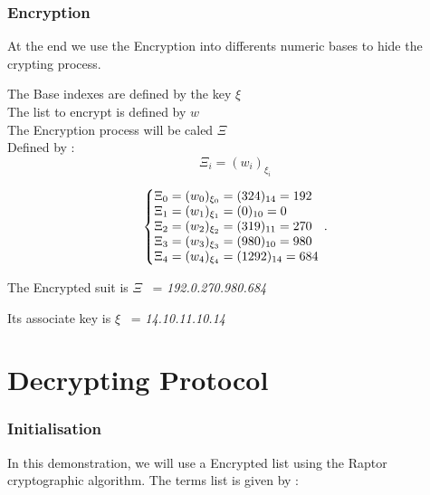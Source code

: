 \documentclass{article}
\begin{document}
\section*{Encryption}
\begin{flushleft}
At the end we use the Encryption into differents numeric bases to hide the crypting process.

The Base indexes are defined by the key $ \xi $ \\
The list to encrypt is defined by $w$ \\
The Encryption process will be caled $ \Xi $ \\
Defined by : 
\begin{equation}
\Xi_{i}=(w_{i})_{\xi_{i}}
\end{equation}
\end{flushleft}

\begin{equation}
\centering
\left\{\begin{array}{@{}l@{}}
\Xi_{0} = (w_{0})_{\xi_{0}}=(324)_{14}=192 \\
\Xi_{1} = (w_{1})_{\xi_{1}}=(0)_{10}=0 \\
\Xi_{2} = (w_{2})_{\xi_{2}}=(319)_{11}=270 \\
\Xi_{3} = (w_{3})_{\xi_{3}}=(980)_{10}=980 \\
\Xi_{4} = (w_{4})_{\xi_{4}}=(1292)_{14}=684 \\
\end{array}\right.\,.
\end{equation}

\begin{flushleft}
The Encrypted suit is $ \Xi $ \ = \textit{192.0.270.980.684}

Its associate key is $ \xi $  \ = \textit{14.10.11.10.14}
\end{flushleft}

\newpage

\part{Decrypting Protocol}

\section*{Initialisation}


\begin{flushleft}
In this demonstration, we will use a Encrypted list using the Raptor cryptographic algorithm.
The terms list is given by :
\end{flushleft}
\end{document}
